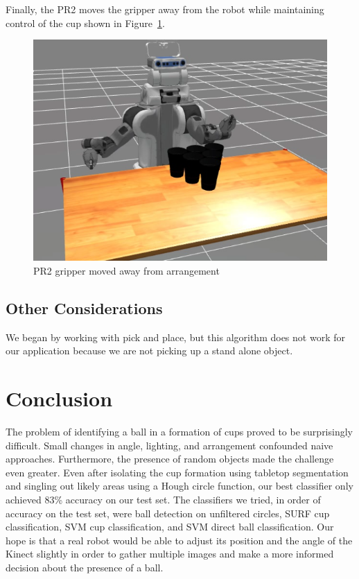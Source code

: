 \documentclass[letterpaper, 10 pt, conference]{ieeeconf}  %
\begin{document}
Finally, the PR2 moves the gripper away from the robot while maintaining control of the cup shown in Figure~\ref{fig:away}.

\begin{figure}[thpb]
      \centering
	  \includegraphics[scale =0.3]{gripper_away}
      \caption{PR2 gripper moved away from arrangement}
      \label{fig:away}
\end{figure}


\subsection{Other Considerations}
We began by working with pick and place, but this algorithm does not work for our application because we are not picking up a stand alone object.


\section{Conclusion}

The problem of identifying a ball in a formation of cups proved to be surprisingly difficult.  Small changes in angle, lighting, and arrangement confounded naive approaches.  Furthermore, the presence of random objects made the challenge even greater.  Even after isolating the cup formation using tabletop segmentation and singling out likely areas using a Hough circle function, our best classifier only achieved 83\% accuracy on our test set.  The classifiers we tried, in order of accuracy on the test set, were ball detection on unfiltered circles, SURF cup classification, SVM cup classification, and SVM direct ball classification.  Our hope is that a real robot would be able to adjust its position and the angle of the Kinect slightly in order to gather multiple images and make a more informed decision about the presence of a ball.
\end{document}
